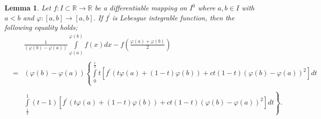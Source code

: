 \documentclass{amsart}
\theoremstyle{plain}
\newtheorem{lemma}{Lemma}
\numberwithin{equation}{section}
\begin{document}
\begin{lemma}
\label{z2} Let $f:I\subset 
\mathbb{R}
\rightarrow 
\mathbb{R}
$ be a differentiable mapping on $I^{0}$ where $a,b\in I$ with $a<b$ and $\varphi :\left[ a,b\right] \rightarrow \left[ a,b\right] .$ If $f^{\prime }\ 
$is Lebesgue integrable function, then the following equality holds;\begin{eqnarray*}
&&\frac{1}{(\varphi (b)-\varphi (a))}\int\limits_{\varphi (a)}^{\varphi
(b)}f\left( x\right) dx-f\left( \frac{\varphi (a)+\varphi (b)}{2}\right)  \\
&& \\
&=&(\varphi (b)-\varphi (a))\left\{ \int\limits_{0}^{\frac{1}{2}}t\left[
f^{\prime }\left( t\varphi (a)+\left( 1-t\right) \varphi (b)\right)
+ct(1-t)(\varphi (b)-\varphi (a))^{2}\right] dt\right.  \\
&& \\
&&\left. \int\limits_{\frac{1}{2}}^{1}\left( t-1\right) \left[ f^{\prime
}\left( t\varphi (a)+\left( 1-t\right) \varphi (b)\right) +ct(1-t)(\varphi
(b)-\varphi (a))^{2}\right] dt\right\} .
\end{eqnarray*}
\end{lemma}
\end{document}
